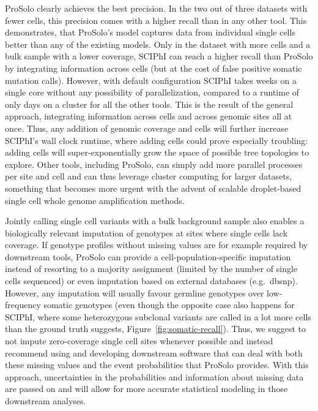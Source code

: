 \documentclass[12pt,inline]{wlscirep}
\begin{document}
ProSolo clearly achieves the best precision.
In the two out of three datasets with fewer cells, this precision comes with a higher recall than in any other tool.
This demonstrates, that ProSolo's model captures data from individual single cells better than any of the existing models.
Only in the dataset with more cells and a bulk sample with a lower coverage, SCIPhI can reach a higher recall than ProSolo by integrating information across cells (but at the cost of false positive somatic mutation calls).
However, with default configuration SCIPhI takes weeks on a single core without any possibility of parallelization, compared to a runtime of only days on a cluster for all the other tools.
This is the result of the general approach, integrating information across cells and across genomic sites all at once.
Thus, any addition of genomic coverage and cells will further increase SCIPhI's wall clock runtime, where adding cells could prove especially troubling: adding cells will super-exponentially grow the space of possible tree topologies to explore.
Other tools, including ProSolo, can simply add more parallel processes per site and cell and can thus leverage cluster computing for larger datasets, something that becomes more urgent with the advent of scalable droplet-based single cell whole genome amplification methods\cite{lahnemann_eleven_2020}.

Jointly calling single cell variants with a bulk background sample also enables a biologically relevant imputation of genotypes at sites where single cells lack coverage.
If genotype profiles without missing values are for example required by downstream tools, ProSolo can provide a cell-population-specific imputation instead of resorting to a majority assignment (limited by the number of single cells sequenced) or even imputation based on external databases (e.g.~dbsnp).
However, any imputation will usually favour germline genotypes over low-frequency somatic genotypes (even though the opposite case also happens for SCIPhI, where some heterozygous subclonal variants are called in a lot more cells than the ground truth suggests, Figure~\ref{fig:somatic-recall}).
Thus, we suggest to not impute zero-coverage single cell sites whenever possible and instead recommend using and developing downstream software that can deal with both these missing values and the event probabilities that ProSolo provides.
With this approach, uncertainties in the probabilities and information about missing data are passed on and will allow for more accurate statistical modeling in those downstream analyses.
\end{document}
